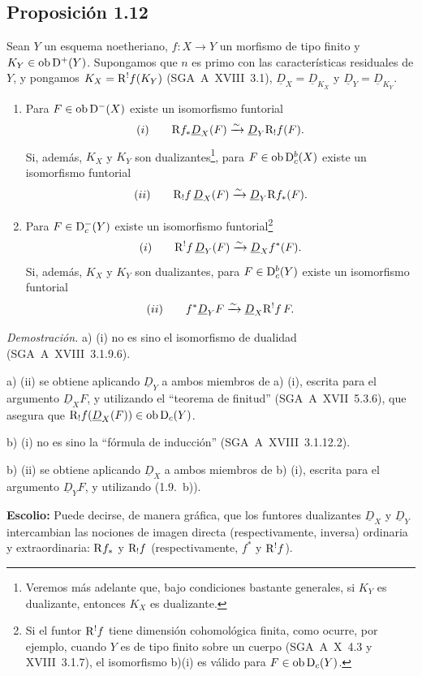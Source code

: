 \subsection*{Proposición 1.12}
Sean $Y$ un esquema noetheriano, $f : X \to Y$ un morfismo de tipo finito y $K_Y \in \operatorname{ob} \mathrm{D}^{+}(Y)$. Supongamos que $n$ es primo con las características residuales de $Y$, y pongamos $K_X = \mathrm{R}^{!}f(K_Y)$ (SGA~A~XVIII~3.1), $\underline{D}_X = \underline{D}_{K_X}$ y $\underline{D}_Y = \underline{D}_{K_Y}$.
\begin{enumerate}
\item[a)] Para $F \in \operatorname{ob} \mathrm{D}^{-}(X)$ existe un isomorfismo funtorial
\[
(i) \qquad \mathrm{R} f_{*} \underline{D}_X(F) \xrightarrow{\sim} \underline{D}_Y \mathrm{R}_{!}f(F).
\]
Si, además, $K_X$ y $K_Y$ son dualizantes\footnote{Veremos más adelante que, bajo condiciones bastante generales, si $K_Y$ es dualizante, entonces $K_X$ es dualizante.}, para $F \in \operatorname{ob} \mathrm{D}_c^{b}(X)$ existe un isomorfismo funtorial
\[
(ii) \qquad \mathrm{R}_{!}f \, \underline{D}_X(F) \xrightarrow{\sim} \underline{D}_Y \mathrm{R} f_{*}(F).
\]
\item[b)] Para $F \in \mathrm{D}_c^{-}(Y)$ existe un isomorfismo funtorial\footnote{Si el funtor $\mathrm{R}^{!}f$ tiene dimensión cohomológica finita, como ocurre, por ejemplo, cuando $Y$ es de tipo finito sobre un cuerpo (SGA~A~X~4.3 y XVIII~3.1.7), el isomorfismo b)(i) es válido para $F \in \operatorname{ob} \mathrm{D}_c(Y)$.}
\[
(i) \qquad \mathrm{R}^{!}f \, \underline{D}_Y(F) \xrightarrow{\sim} \underline{D}_X f^{*}(F).
\]
Si, además, $K_X$ y $K_Y$ son dualizantes\footnotemark[3], para $F \in \mathrm{D}_c^{b}(Y)$ existe un isomorfismo funtorial
\[
(ii) \qquad f^{*} \underline{D}_Y F \xrightarrow{\sim} \underline{D}_X \mathrm{R}^{!}f \, F.
\]
\end{enumerate}

\emph{Demostración.} a) (i) no es sino el isomorfismo de dualidad (SGA~A~XVIII~3.1.9.6).

a) (ii) se obtiene aplicando $\underline{D}_Y$ a ambos miembros de a) (i), escrita para el argumento $\underline{D}_X F$, y utilizando el \textquotedblleft teorema de finitud\textquotedblright{} (SGA~A~XVII~5.3.6), que asegura que $\mathrm{R}_{!}f(\underline{D}_X(F)) \in \operatorname{ob} \mathrm{D}_c(Y)$.

b) (i) no es sino la \textquotedblleft fórmula de inducción\textquotedblright{} (SGA~A~XVIII~3.1.12.2).

b) (ii) se obtiene aplicando $\underline{D}_X$ a ambos miembros de b) (i), escrita para el argumento $\underline{D}_Y F$, y utilizando (1.9.~b)).

\textbf{Escolio:} Puede decirse, de manera gráfica, que los funtores dualizantes $\underline{D}_X$ y $\underline{D}_Y$ intercambian las nociones de imagen directa (respectivamente, inversa) ordinaria y extraordinaria: $\mathrm{R} f_{*}$ y $\mathrm{R}_{!}f$ (respectivamente, $f^{*}$ y $\mathrm{R}^{!}f$).
